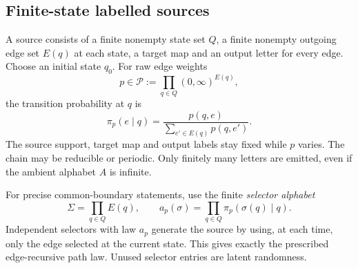 \documentclass[11pt]{article}
\theoremstyle{definition}
\theoremstyle{remark}
\begin{document}
\subsection{Finite-state labelled sources}
A source consists of a finite nonempty state set $Q$, a finite nonempty outgoing edge set $E(q)$ at each state, a target map and an output letter for every edge. Choose an initial state $q_0$. For raw edge weights
\[
 p\in\mathcal P:=\prod_{q\in Q}(0,\infty)^{E(q)},
\]
the transition probability at $q$ is
\[
 \pi_p(e\mid q)=\frac{p(q,e)}{\sum_{e'\in E(q)}p(q,e')}.
\]
The source support, target map and output labels stay fixed while $p$ varies. The chain may be reducible or periodic. Only finitely many letters are emitted, even if the ambient alphabet $A$ is infinite.

For precise common-boundary statements, use the finite \emph{selector alphabet}
\[
 \Sigma=\prod_{q\in Q}E(q),\qquad
 a_p(\sigma)=\prod_{q\in Q}\pi_p(\sigma(q)\mid q).
\]
Independent selectors with law $a_p$ generate the source by using, at each time, only the edge selected at the current state. This gives exactly the prescribed edge-recursive path law. Unused selector entries are latent randomness.
\end{document}
